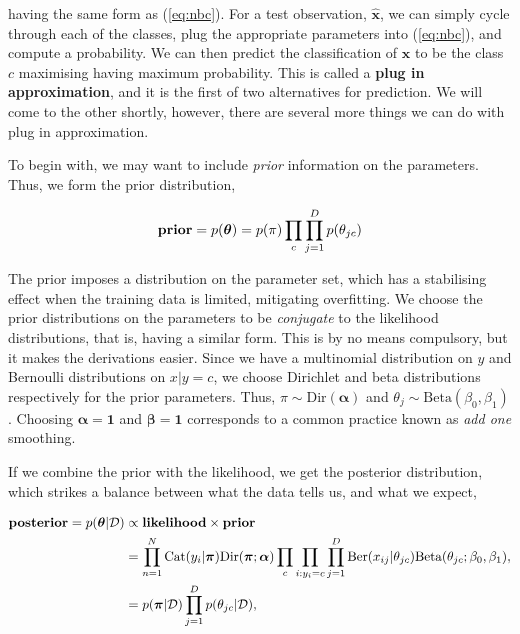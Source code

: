 \documentclass[11pt]{amsart}
\begin{document}
having the same form as (\ref{eq:nbc}). For a test observation, $\hat{\mathbf{x}}$, we can simply cycle through each of the classes, plug the appropriate parameters into (\ref{eq:nbc}), and compute a probability. We can then predict the classification of $\mathbf{x}$ to be the class $c$ maximising having maximum probability. This is called a \textbf{plug in approximation}, and it is the first of two alternatives for prediction. We will come to the other shortly, however, there are several more things we can do with plug in approximation.

To begin with, we may want to include \emph{prior} information on the parameters. Thus, we form the prior distribution,

\begin{align}
\textbf{prior} = p(\boldsymbol\theta) = p(\pi)\prod_c\prod_{j=1}^Dp(\theta_{jc}) \notag
\end{align}

The prior imposes a distribution on the parameter set, which has a stabilising effect when the training data is limited, mitigating overfitting. We choose the prior distributions on the parameters to be \emph{conjugate} to the likelihood distributions, that is, having a similar form. This is by no means compulsory, but it makes the derivations easier. Since we have a multinomial distribution on $y$ and Bernoulli distributions on $x|y=c$, we choose Dirichlet and beta distributions respectively for the prior parameters. Thus, $\pi \sim \text{Dir}(\boldsymbol\alpha)$ and $\theta_j \sim \text{Beta}(\beta_0, \beta_1)$. Choosing $\boldsymbol\alpha = \mathbf{1}$ and $\boldsymbol\beta = \mathbf{1}$ corresponds to a common practice known as \emph{add one} smoothing.

If we combine the prior with the likelihood, we get the posterior distribution, which strikes a balance between what the data tells us, and what we expect,

\begin{align}
\textbf{posterior} = p(\boldsymbol\theta|\mathcal{D}) &\propto \textbf{likelihood} \times \textbf{prior} \notag \\
&= \prod_{n=1}^N\text{Cat}(y_i|\boldsymbol\pi)\text{Dir}(\boldsymbol\pi;\boldsymbol\alpha)\prod_{c}\prod_{i:y_i = c}\prod_{j = 1}^D \text{Ber}(x_{ij}|\theta_{jc})\text{Beta}(\theta_{jc};\beta_0, \beta_1), \notag \\
&= p(\boldsymbol\pi|\mathcal{D})\prod_{j = 1}^D p(\theta_{jc}|\mathcal{D}), \notag
\end{align}
\end{document}
